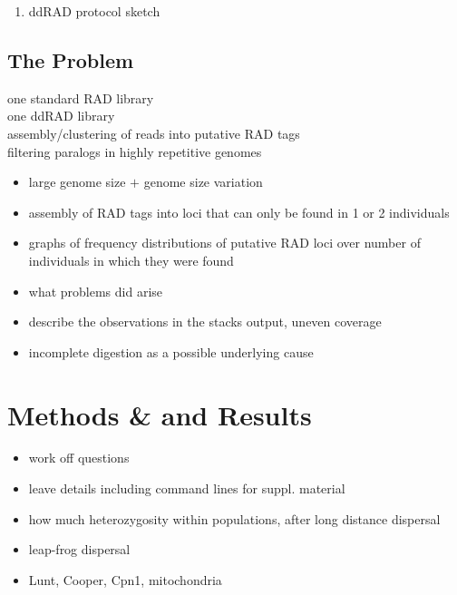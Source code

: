 \documentclass[a4paper,12pt,times,print,index, custombib]{PhDThesisPSnPDF}\usepackage[]{graphicx}\usepackage[]{color}
\begin{document}
\begin{enumerate}
\item ddRAD protocol sketch
\end{enumerate}

\subsection{The Problem}
one standard RAD library \\
one ddRAD library \\
assembly/clustering of reads into putative RAD tags \\
filtering paralogs in highly repetitive genomes \\


\begin{itemize}
\item large genome size $+$ genome size variation
\item assembly of RAD tags into loci that can only be found in 1 or 2 individuals
\item graphs of frequency distributions of putative RAD loci over number of individuals in which they were found
\end{itemize}

\begin{itemize}
\item what problems did arise
\item describe the observations in the stacks output, uneven coverage
\item incomplete digestion as a possible underlying cause
\end{itemize}

\section{Methods \& and Results}

\begin{itemize}
\item work off questions
\item leave details including command lines for suppl. material
\item how much heterozygosity within populations, after long distance dispersal
\item leap-frog dispersal
\item Lunt, Cooper, Cpn1, mitochondria
\end{itemize}
\end{document}
